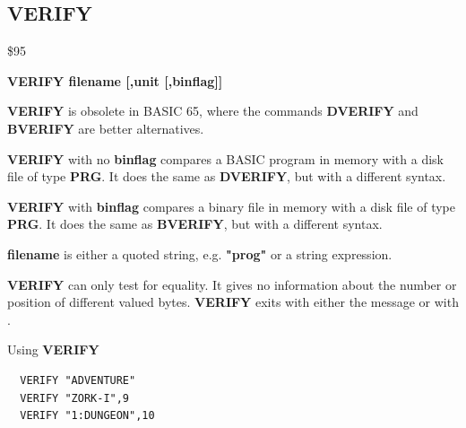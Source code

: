 \subsection{VERIFY}
\begin{description}[leftmargin=2cm,style=nextline]
\item [Token:] \$95
\item [Format:] {\bf VERIFY filename [,unit [,binflag]] }
\item [Usage:]
   {\bf VERIFY} is obsolete in BASIC 65, where the commands
   {\bf DVERIFY} and {\bf BVERIFY} are better alternatives.

   {\bf VERIFY} with no {\bf binflag} compares a BASIC program
   in memory with a disk file of type {\bf PRG}.
   It does the same as {\bf DVERIFY}, but with a different syntax.

   {\bf VERIFY} with {\bf binflag} compares a binary file
   in memory with a disk file of type {\bf PRG}.
   It does the same as {\bf BVERIFY}, but with a different syntax.

   {\bf filename} is either a quoted string, e.g. {\bf "prog"} or
   a string expression.

   \unitdefinition

\item [Remarks:]
   {\bf VERIFY} can only test for equality. It gives no information
   about the number or position of different valued bytes.
    {\bf VERIFY} exits with either the message 
   or with .

\item [Example:] Using {\bf VERIFY}
\begin{tcolorbox}[colback=black,coltext=white]
\verbatimfont{\codefont}
\begin{verbatim}
  VERIFY "ADVENTURE"
  VERIFY "ZORK-I",9
  VERIFY "1:DUNGEON",10
\end{verbatim}
\end{tcolorbox}
\end{description}


\newpage
